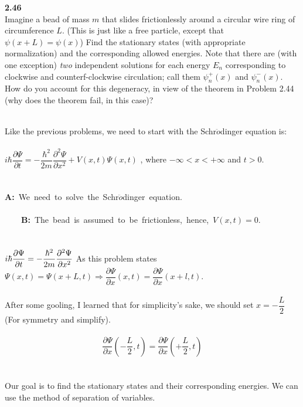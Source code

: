 \documentclass[fleqn]{article}
\begin{document}
  \textbf{2.46}
  \\
  Imagine a bead of mass $m$ that slides frictionlessly around a circular wire ring of circumference $L$. 
  (This is just like a free particle, except that $\psi(x+L)=\psi(x)$) Find the stationary states (with
  appropriate normalization) and the corresponding allowed energies. Note that there are (with one exception)
  \emph{two} independent solutions for each energy $E_n$ corresponding to clockwise and counterf-clockwise
  circulation; call them $\psi^+_n(x)$ and $\psi^-_n(x)$. How do you account for this degeneracy, in
  view of the theorem in Problem 2.44 (why does the theorem fail, in this case)?

  \textcolor{hwColor}{
    \\
    Like the previous problems, we need to start with the Schr$\ddot{o}$dinger equation is: \\
    \\
    $
      i\hbar \dfrac{\partial \Psi}{\partial t}=-\dfrac{\hbar^2}{2m}\dfrac{\partial^2 \Psi}{\partial x^2}+V(x,t) \Psi(x,t)
    $
    , where $-\infty<x<+\infty$ and $t>0$. \\
    \\
    \\
    \textbf{A:} We need to solve the Schr$\ddot{o}$dinger equation. \\ 
    \\
    \textbf{B:} The bead is assumed to be frictionless, hence, $V(x,t)=0$. \\
    \\
    \\
    $
      i\hbar \dfrac{\partial \Psi}{\partial t}=-\dfrac{\hbar^2}{2m}\dfrac{\partial^2 \Psi}{\partial x^2} \\ \\
    $
    As this problem states $\Psi(x,t)=\Psi(x+L,t) \Longrightarrow \dfrac{\partial \Psi}{\partial x}(x,t)=\dfrac{\partial \Psi}{\partial x}(x+l, t)$. \\ \\
    After some gooling, I learned that for simplicity's sake, we should set $x=-\dfrac{L}{2}$ (For symmetry and simplify). \\
    \\
    $$
      \dfrac{\partial \Psi}{\partial x}(-\dfrac{L}{2},t)=\dfrac{\partial \Psi}{\partial x}(+\dfrac{L}{2}, t)
    $$
    \\
    \\
    Our goal is to find the stationary states and their corresponding energies. We can use the method of separation of variables.
}
\end{document}
